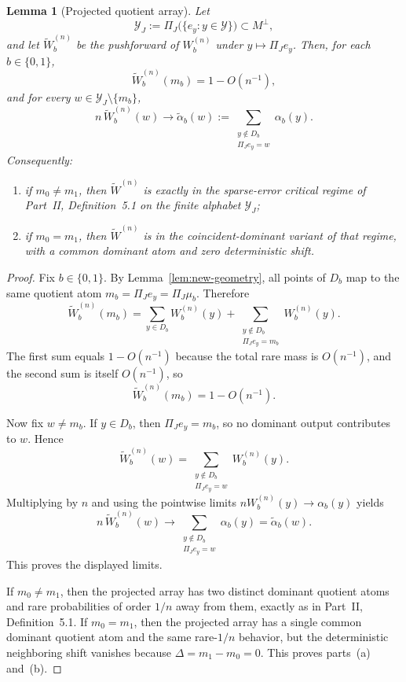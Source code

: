 \documentclass{article}
\newtheorem{lemma}[theorem]{Lemma}
\newcommand{\1}{\mathbf 1}
\begin{document}
\begin{lemma}[Projected quotient array]
\label{lem:new-projected-array}
Let
\[
\mathcal Y_J:=\Pi_J\bigl(\{e_y:y\in\mathcal Y\}\bigr)\subset M^\perp,
\]
and let $\widetilde W_b^{(n)}$ be the pushforward of $W_b^{(n)}$ under $y\mapsto \Pi_J e_y$.
Then, for each $b\in\{0,1\}$,
\[
\widetilde W_b^{(n)}(m_b)=1-O(n^{-1}),
\]
and for every $w\in\mathcal Y_J\setminus\{m_b\}$,
\[
n\,\widetilde W_b^{(n)}(w)\longrightarrow \widetilde\alpha_b(w)
:=
\sum_{\substack{y\notin D_b\\ \Pi_J e_y=w}}\alpha_b(y).
\]
Consequently:
\begin{enumerate}
\item[(a)] if $m_0\neq m_1$, then $\widetilde W^{(n)}$ is exactly in the sparse-error critical regime of
Part~II, Definition~5.1 on the finite alphabet $\mathcal Y_J$;
\item[(b)] if $m_0=m_1$, then $\widetilde W^{(n)}$ is in the coincident-dominant variant of that regime,
with a common dominant atom and zero deterministic shift.
\end{enumerate}
\end{lemma}

\begin{proof}
Fix $b\in\{0,1\}$. By Lemma~\ref{lem:new-geometry}, all points of $D_b$ map to the same quotient atom
$m_b=\Pi_Je_y=\Pi_J\mu_b$. Therefore
\[
\widetilde W_b^{(n)}(m_b)
=
\sum_{y\in D_b}W_b^{(n)}(y)+\sum_{\substack{y\notin D_b\\ \Pi_Je_y=m_b}}W_b^{(n)}(y).
\]
The first sum equals $1-O(n^{-1})$ because the total rare mass is $O(n^{-1})$, and the second sum is itself
$O(n^{-1})$, so
\[
\widetilde W_b^{(n)}(m_b)=1-O(n^{-1}).
\]

Now fix $w\neq m_b$. If $y\in D_b$, then $\Pi_Je_y=m_b$, so no dominant output contributes to $w$. Hence
\[
\widetilde W_b^{(n)}(w)=\sum_{\substack{y\notin D_b\\ \Pi_Je_y=w}}W_b^{(n)}(y).
\]
Multiplying by $n$ and using the pointwise limits $nW_b^{(n)}(y)\to \alpha_b(y)$ yields
\[
n\,\widetilde W_b^{(n)}(w)
\to
\sum_{\substack{y\notin D_b\\ \Pi_Je_y=w}}\alpha_b(y)=\widetilde\alpha_b(w).
\]
This proves the displayed limits.

If $m_0\neq m_1$, then the projected array has two distinct dominant quotient atoms and rare probabilities of
order $1/n$ away from them, exactly as in Part~II, Definition~5.1. If $m_0=m_1$, then the projected array has a
single common dominant quotient atom and the same rare-$1/n$ behavior, but the deterministic neighboring shift
vanishes because $\Delta=m_1-m_0=0$. This proves parts~(a) and~(b).
\end{proof}
\end{document}
